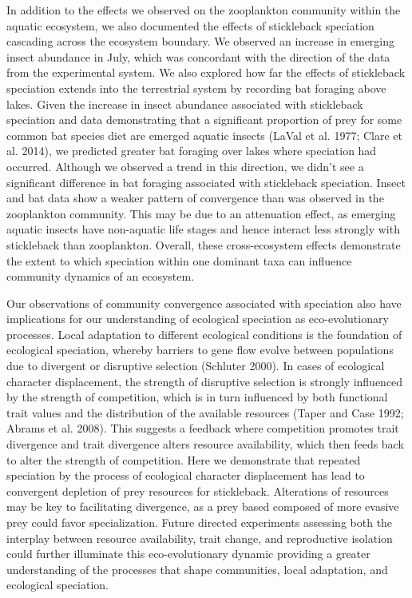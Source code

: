 \documentclass[11pt]{article}
\begin{document}
In addition to the effects we observed on the zooplankton community within the aquatic ecosystem, we also documented the effects of stickleback speciation cascading across the ecosystem boundary.  We observed an increase in emerging insect abundance in July, which was concordant with the direction of the data from the experimental system.  We also explored how far the effects of stickleback speciation extends into the terrestrial system by recording bat foraging above lakes.  Given the increase in insect abundance associated with stickleback speciation and data demonstrating that a significant proportion of prey for some common bat species diet are emerged aquatic insects (LaVal et al. 1977; Clare et al. 2014), we predicted greater bat foraging over lakes where speciation had occurred.  Although we observed a trend in this direction, we didn’t see a significant difference in bat foraging associated with stickleback speciation.  Insect and bat data show a weaker pattern of convergence than was observed in the zooplankton community.  This may be due to an attenuation effect, as emerging aquatic insects have non-aquatic life stages and hence interact less strongly with stickleback than zooplankton.  Overall, these cross-ecosystem effects demonstrate the extent to which speciation within one dominant taxa can influence community dynamics of an ecosystem. 

Our observations of community convergence associated with speciation also have implications for our understanding of ecological speciation as eco-evolutionary processes.  Local adaptation to different ecological conditions is the foundation of ecological speciation, whereby barriers to gene flow evolve between populations due to divergent or disruptive selection (Schluter 2000).  In cases of ecological character displacement, the strength of disruptive selection is strongly influenced by the strength of competition, which is in turn influenced by both functional trait values and the distribution of the available resources (Taper and Case 1992; Abrams et al. 2008).  This suggests a feedback where competition promotes trait divergence and trait divergence alters resource availability, which then feeds back to alter the strength of competition.  Here we demonstrate that repeated speciation by the process of ecological character displacement has lead to convergent depletion of prey resources for stickleback.  Alterations of resources may be key to facilitating divergence, as a prey based composed of more evasive prey could favor specialization.  Future directed experiments assessing both the interplay between resource availability, trait change, and reproductive isolation could further illuminate this eco-evolutionary dynamic providing a greater understanding of the processes that shape communities, local adaptation, and ecological speciation.  
\end{document}
